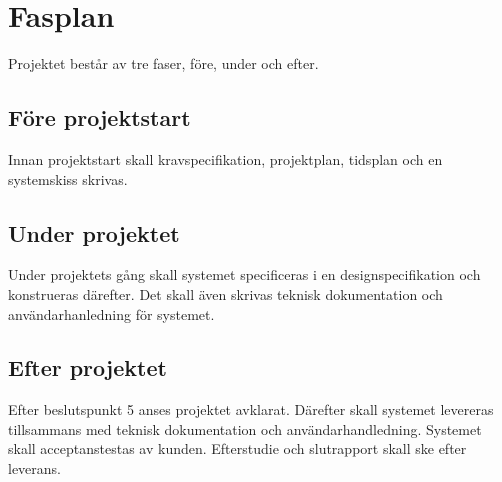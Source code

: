 \section{Fasplan}
Projektet består av tre faser, före, under och efter.

\subsection{Före projektstart}
Innan projektstart skall kravspecifikation, projektplan, tidsplan och en systemskiss skrivas.

\subsection{Under projektet}
Under projektets gång skall systemet specificeras i en designspecifikation och konstrueras därefter. Det skall även skrivas teknisk dokumentation och användarhanledning för systemet.

\subsection{Efter projektet}
Efter beslutspunkt 5 anses projektet avklarat. Därefter skall systemet levereras tillsammans med teknisk dokumentation och användarhandledning. Systemet skall acceptanstestas av kunden. Efterstudie och slutrapport skall ske efter leverans.
